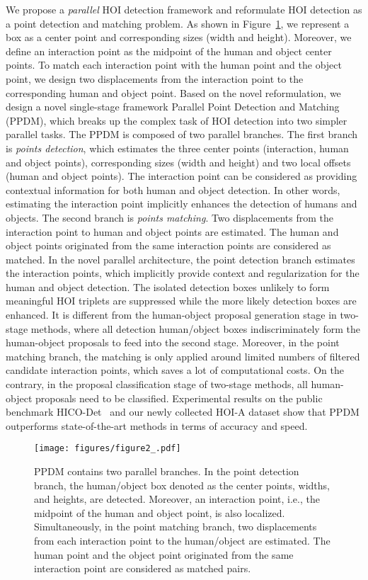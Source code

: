 \documentclass[10pt,twocolumn,letterpaper]{article}
\begin{document}
We propose a \emph{parallel} HOI detection framework and reformulate HOI detection as a point detection and matching problem. As shown in Figure~\ref{fig:key_idea}, we represent a box as a center point and corresponding sizes (width and height). Moreover, we define an interaction point as the midpoint of the human and object center points. To match each interaction point with the human point and the object point, we design two displacements from the interaction point to the corresponding human and object point. Based on the novel reformulation, we design a novel single-stage framework Parallel Point Detection and Matching (PPDM), which breaks up the complex task of  HOI detection into two simpler parallel tasks. The PPDM is composed of two parallel branches. The first branch is \emph{points detection}, which estimates the three center points (interaction, human and object points), corresponding sizes (width and height) and two local offsets (human and object points). 
The interaction point can be considered as providing contextual information for both human and object detection. In other words, estimating the interaction point implicitly enhances the detection of humans and objects. 
The second branch is  \emph{points matching}. Two displacements from the interaction point to human and object points are estimated.  The human and object points originated from the same interaction points are considered as matched. In the novel parallel architecture, the point detection branch estimates the interaction points, which implicitly provide context and regularization for the human and object detection. The isolated detection boxes unlikely to form meaningful HOI triplets are suppressed while the more likely detection boxes are enhanced. It is different from the human-object proposal generation stage in two-stage methods, where all detection human/object boxes indiscriminately form the human-object proposals to feed into the second stage. Moreover, in the point matching branch, the matching is only applied around limited numbers of filtered candidate interaction points, which saves a lot of computational costs. On the contrary, in the proposal classification stage of two-stage methods, all human-object proposals need to be classified. Experimental results on the public benchmark HICO-Det~\cite{chao2018learning} and our newly collected HOI-A dataset show that PPDM outperforms state-of-the-art methods in terms of accuracy and speed. 
\begin{figure}[t]
	\centering
	\texttt{[image: figures/figure2\_.pdf]}
	\caption{ PPDM contains two parallel branches. In the point detection branch, the human/object box denoted as the center points, widths, and heights, are detected. Moreover, an interaction point, i.e., the midpoint of the human and object point, is also localized.
    Simultaneously, in the point matching branch, two displacements from each interaction point to the human/object are estimated. The human point and the object point originated from the same interaction point are considered as matched pairs. }
	\label{fig:key_idea}
	  \vspace{-3mm}
\end{figure}
\end{document}
